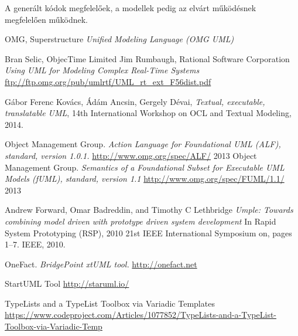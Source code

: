 \documentclass[a4paper,12pt]{report}
\begin{document}
A generált kódok megfelelőek, a modellek pedig az elvárt működésnek megfelelően működnek.

\begin{thebibliography}{4}


	OMG, Superstructure
	\emph{Unified Modeling Language (OMG UML)}

	Bran Selic, ObjecTime Limited
	Jim Rumbaugh, Rational Software Corporation
	\emph{Using UML for Modeling Complex Real-Time Systems}
	\url{ftp://ftp.omg.org/pub/umlrtf/UML_rt_ext_F56dist.pdf}
	

  Gábor Ferenc Kovács, Ádám Ancsin, Gergely Dévai,
  \emph{Textual, executable, translatable UML},
  14th International Workshop on OCL and Textual Modeling, 
  2014. 

	Object Management Group. 	
	\emph{Action Language for Foundational UML (ALF), standard, version 1.0.1.}
	\url{http://www.omg.org/spec/ALF/} 2013
	Object Management Group. 
	\emph{Semantics of a Foundational Subset for Executable UML Models (fUML), standard, version 1.1}
	\url{http://www.omg.org/spec/FUML/1.1/} 2013
	
	Andrew Forward, Omar Badreddin, and Timothy C Lethbridge
	\emph{Umple: Towards combining model driven with prototype driven system development}
	In Rapid System Prototyping (RSP), 2010 21st IEEE International Symposium on, pages 1–7. IEEE, 2010.

	OneFact.	
	\emph{BridgePoint xtUML tool.} 
	\url{http://onefact.net}
	
	StartUML Tool
	\url{http://staruml.io/}
	
	TypeLists and a TypeList Toolbox via Variadic Templates
	\url{https://www.codeproject.com/Articles/1077852/TypeLists-and-a-TypeList-Toolbox-via-Variadic-Temp}

	
\end{thebibliography}
\end{document}
